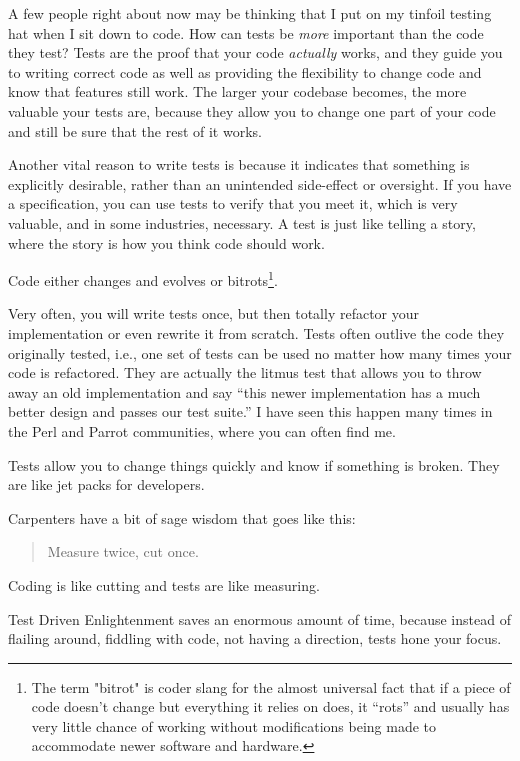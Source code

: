 A few people right about now may be thinking that I put on my tinfoil testing hat when I sit down to code. How can tests be \emph{more} important than the code they test? Tests are the proof that your code \emph{actually} works, and they guide you to writing correct code as well as providing the flexibility to change code and know that features still work. The larger your codebase becomes, the more valuable your tests are, because they allow you to change one part of your code and still be sure that the rest of it works.

Another vital reason to write tests is because it indicates that something is explicitly desirable, rather than an unintended side-effect or oversight. If you have a specification, you can use tests to verify that you meet it, which is very valuable, and in some industries, necessary. A test is just like telling a story, where the story is how you think code should work.

Code either changes and evolves or bitrots\footnote{The term "bitrot" is coder slang for the almost universal fact that if a piece of code doesn't change but everything it relies on does, it ``rots'' and usually has very little chance of working without modifications being made to accommodate newer software and hardware.}.

Very often, you will write tests once, but then totally refactor your implementation or even rewrite it from scratch. Tests often outlive the code they originally tested, i.e., one set of tests can be used no matter how many times your code is refactored. They are actually the litmus test that allows you to throw away an old implementation and say ``this newer implementation has a much better design and passes our test suite.'' I have seen this happen many times in the Perl and Parrot communities, where you can often find me.

Tests allow you to change things quickly and know if something is broken. They are like jet packs for developers.

Carpenters have a bit of sage wisdom that goes like this:
\begin{quote}Measure twice, cut once.\end{quote} 

Coding is like cutting and tests are like measuring.

Test Driven Enlightenment saves an enormous amount of time, because instead of flailing around, fiddling with code, not having a direction, tests hone your focus.

